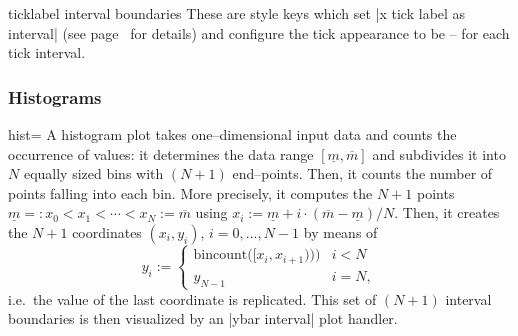 {\begin{pgfplotsxykey}{\x ticklabel interval boundaries}
	These are style keys which set |x tick label as interval| (see page~\pageref{key:pgfplots:ticklabelasinterval} for details) and configure the tick appearance to be  --  for each tick interval.
\end{pgfplotsxykey}

\subsubsection{Histograms}
\begin{plottype}[/pgfplots]{hist=\textcolor{black}{\normalfont{}}}
	A histogram plot takes one--dimensional input data and counts the occurrence of values: it determines the data range $[\underline m,\overline m]$ and subdivides it into $N$ equally sized bins with $(N+1)$ end--points. Then, it counts the number of points falling into each bin. More precisely, it computes the $N+1$ points $\underline m =: x_0 < x_1 < \dotsb < x_N := \overline m$ using $x_i := \underline m + i \cdot (\overline m - \underline m)/N$. Then, it creates the $N+1$ coordinates $(x_i, y_i)$, $i=0,\dotsc,N-1$ by means of
	\[
  y_i := 
  \begin{cases}
  \text{bincount}\bigl([x_i,x_{i+1})\bigr)\Bigr) & i<N\\
  y_{N-1} & i = N,
\end{cases}
	\]
	i.e.\ the value of the last coordinate is replicated.
	This set of $(N+1)$ interval boundaries is then visualized by an |ybar interval| plot handler.
\begin{codeexample}[]
\end{codeexample}
\end{plottype}}
